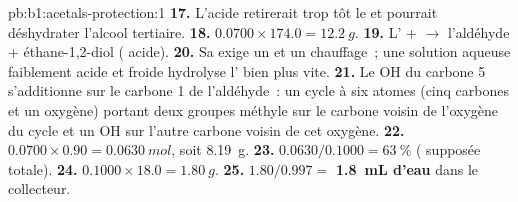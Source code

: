 \begin{solution}{pb:b1:acetals-protection:1}
\textbf{17.} L'acide retirerait trop tôt le  et
pourrait déshydrater l'alcool tertiaire.
\textbf{18.} $0.0700 \times 174.0 = \qty{12.2}{g}$.
\textbf{19.} L' +  $\to$ l'aldéhyde + éthane-1,2-diol
( acide).
\textbf{20.} Sa  exige un  et un chauffage~; une
solution aqueuse faiblement acide et froide hydrolyse l' bien plus
vite.
\textbf{21.} Le OH du carbone 5 s'additionne sur le carbone 1 de
l'aldéhyde~: un cycle à six atomes (cinq carbones et un oxygène) portant
deux groupes méthyle sur le carbone voisin de l'oxygène du cycle et un
OH sur l'autre carbone voisin de cet oxygène.
\textbf{22.} $0.0700 \times 0.90 = \qty{0.0630}{mol}$, soit \qty{8.19}{g}.
\textbf{23.} $0.0630/0.1000 = \qty{63}{\percent}$ ( supposée
totale).
\textbf{24.} $0.1000 \times 18.0 = \qty{1.80}{g}$.
\textbf{25.} $1.80/0.997 =$ \textbf{\qty{1.8}{mL} d'eau} dans le collecteur.
\end{solution}
